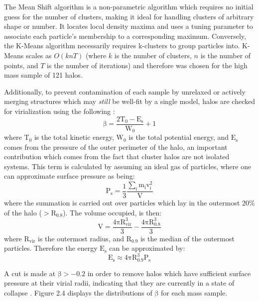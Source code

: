The Mean Shift algorithm is a non-parametric algorithm which 
requires no initial guess for the number of clusters, making it
ideal for handling clusters of arbitrary shape or number. It locates
local density maxima and uses a tuning parameter to associate each particle's
membership to a corresponding maximum. Conversely, the K-Means
algorithm necessarily requires k-clusters to group particles into. K-Means scales as $O(knT)$ (where $k$ is
the number of clusters, $n$ is the number of points, and $T$ is the
number of iterations) and therefore was chosen for the high mass sample of 121 halos.

Additionally, to prevent contamination of each sample by unrelaxed or
actively merging structures which may {\em still} be well-fit by a single
model, halos are checked for virialization using the following \citep{ShawEtAl2006}:   
\begin{equation}
\mathrm{\beta = \frac{2T_{0}-E_{s}}{W_{0}} + 1}
\end{equation}
where $\mathrm{T_{0}}$ is the total kinetic energy, $\mathrm{W_{0}}$ is the total
potential energy, and $\mathrm{E_{s}}$ comes from the pressure of the outer
perimeter of the halo, an important contribution which comes from the
fact that cluster halos are not isolated systems. This term is calculated by
assuming an ideal gas of particles, where one can approximate surface pressure
as being:
\begin{equation}
\mathrm{P_{s} = \frac{1}{3} \frac{\sum_{i} m_{i}v_{i}^{2}}{V}}
\end{equation}
where the summation is carried out over particles which lay in the outermost
20\% of the halo ($\mathrm{>R_{0.8}}$). The volume occupied, is then:
\begin{equation}
\mathrm{V = \frac{4\pi R_{vir}^{3}}{3} - \frac{4\pi R_{0.8}^{3}}{3}}
\end{equation}
where $\mathrm{R_{vir}}$ is the outermost radius, and $\mathrm{R_{0.9}}$ is
the median of the outermost particles. Therefore the energy $\mathrm{E_{s}}$
can be approximated by: 
\begin{equation}
\mathrm{E_{s} \approx 4 \pi R_{0.9}^{3} P_{s}}
\end{equation}

A cut is made at $\mathrm{\beta > -0.2}$ in order to remove halos which have sufficient
surface pressure at their virial radii, indicating that they are currently in a state
of collapse \citep{ShawEtAl2006}. Figure 2.4 displays the distributions of
$\mathrm{\beta}$ for each mass sample.

